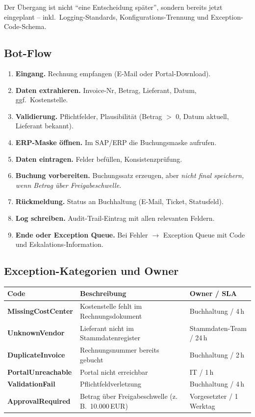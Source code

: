 \documentclass[11pt,a4paper,oneside]{article}
\begin{document}
Der Übergang ist nicht ``eine Entscheidung später'', sondern bereits jetzt eingeplant -- inkl.\ Logging-Standards, Konfigurations-Trennung und Exception-Code-Schema.

\subsection{Bot-Flow}

\begin{enumerate}
  \item \textbf{Eingang.} Rechnung empfangen (E-Mail oder Portal-Download).
  \item \textbf{Daten extrahieren.} Invoice-Nr, Betrag, Lieferant, Datum, ggf.\ Kostenstelle.
  \item \textbf{Validierung.} Pflichtfelder, Plausibilität (Betrag $>$ 0, Datum aktuell, Lieferant bekannt).
  \item \textbf{ERP-Maske öffnen.} Im SAP/ERP die Buchungsmaske aufrufen.
  \item \textbf{Daten eintragen.} Felder befüllen, Konsistenzprüfung.
  \item \textbf{Buchung vorbereiten.} Buchungssatz erzeugen, aber \emph{nicht final speichern, wenn Betrag über Freigabeschwelle}.
  \item \textbf{Rückmeldung.} Status an Buchhaltung (E-Mail, Ticket, Statusfeld).
  \item \textbf{Log schreiben.} Audit-Trail-Eintrag mit allen relevanten Feldern.
  \item \textbf{Ende oder Exception Queue.} Bei Fehler $\to$ Exception Queue mit Code und Eskalations-Information.
\end{enumerate}

\subsection{Exception-Kategorien und Owner}

\begin{tabularx}{\linewidth}{@{}>{\bfseries}lXX@{}}
\toprule
Code & Beschreibung & Owner / SLA \\
\midrule
MissingCostCenter & Kostenstelle fehlt im Rechnungsdokument & Buchhaltung / 4\,h \\
UnknownVendor & Lieferant nicht im Stammdatenregister & Stammdaten-Team / 24\,h \\
DuplicateInvoice & Rechnungsnummer bereits gebucht & Buchhaltung / 2\,h \\
PortalUnreachable & Portal nicht erreichbar & IT / 1\,h \\
ValidationFail & Pflichtfeldverletzung & Buchhaltung / 4\,h \\
ApprovalRequired & Betrag über Freigabeschwelle (z.\,B.\ 10.000\,EUR) & Vorgesetzter / 1\,Werktag \\
\bottomrule
\end{tabularx}
\end{document}
